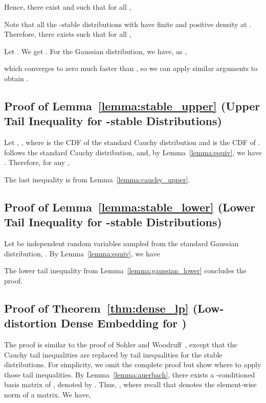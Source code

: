 \documentclass[11pt]{article}
\begin{document}
Hence, there exist  and  such that for all ,

Note that all the -stable distributions with  have finite and
positive density at .
Therefore, there exists  such that for all ,

Let .
We get .
For the Gaussian distribution, we have, as ,

which converges to zero much faster than , so we can apply similar
arguments to obtain .



\subsection{Proof of Lemma~\ref{lemma:stable_upper} (Upper Tail Inequality for -stable Distributions)}
\label{sxn:pf-lp-stable-upper}

Let , , where  is the CDF of the
standard Cauchy distribution and  is the CDF of .
 follows the standard Cauchy distribution, and, by Lemma~\ref{lemma:equiv},
we have .
Therefore, for any ,

The last inequality is from Lemma~\ref{lemma:cauchy_upper}.



\subsection{Proof of Lemma~\ref{lemma:stable_lower} (Lower Tail Inequality for -stable Distributions)}
\label{sxn:pf-lp-stable-lower}

Let  be independent random variables sampled from the standard Gaussian
distribution, .
By Lemma~\ref{lemma:equiv}, we have

The lower tail inequality from Lemma~\ref{lemma:gaussian_lower} concludes the
proof.



\subsection{Proof of Theorem~\ref{thm:dense_lp} (Low-distortion Dense Embedding for
  )}
\label{sxn:pf-dense_lp}

The proof is similar to the proof of Sohler and Woodruff~\cite[Theorem~5]{SW11},
except that the Cauchy tail inequalities are replaced by tail inequalities for
the stable distributions.
For simplicity, we omit the complete proof but show where to apply those tail
inequalities.
By Lemma~\ref{lemma:auerbach}, there exists a -conditioned
basis matrix of , denoted by .
Thus, , where recall that  denotes the element-wise 
 norm of a matrix.
We have,
\end{document}
